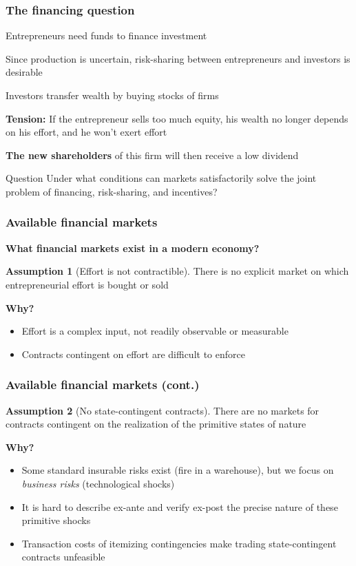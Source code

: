\documentclass[blue]{beamer}
\theoremstyle{definition}
\newtheorem*{assumption}{Assumption}
\theoremstyle{example}
\begin{document}
\begin{frame}\frametitle{The financing question}
Entrepreneurs need funds to finance investment
\bigskip

Since production is uncertain, risk-sharing between entrepreneurs and investors is desirable
\bigskip

Investors transfer wealth by buying stocks of firms
\bigskip

\textbf{Tension:} If the entrepreneur sells too much equity, his wealth no longer depends on his effort, and he won't exert effort
\bigskip

\textbf{The new shareholders} of this firm will then receive a low dividend
\bigskip

\begin{block}{Question}
Under what conditions can markets satisfactorily solve the joint problem of financing, risk-sharing, and incentives?
\end{block}
\end{frame}

\begin{frame}\frametitle{Available financial markets}
\textbf{What financial markets exist in a modern economy?}
\bigskip

\begin{assumption}[Effort is not contractible]
There is no explicit market on which entrepreneurial effort is bought or sold
\end{assumption}
\bigskip

\textbf{Why?}
\begin{itemize}
\item Effort is a complex input, not readily observable or measurable
\item Contracts contingent on effort are difficult to enforce
\end{itemize}
\end{frame}

\begin{frame}\frametitle{Available financial markets (cont.)}
\begin{assumption}[No state-contingent contracts]
There are no markets for contracts contingent on the realization of the primitive states of nature
\end{assumption}
\bigskip

\textbf{Why?}
\begin{itemize}
\item Some standard insurable risks exist (fire in a warehouse), but we focus on \emph{business risks} (technological shocks)
\item It is hard to describe ex-ante and verify ex-post the precise nature of these primitive shocks
\item Transaction costs of itemizing contingencies make trading state-contingent contracts unfeasible
\end{itemize}
\end{frame}
\end{document}
